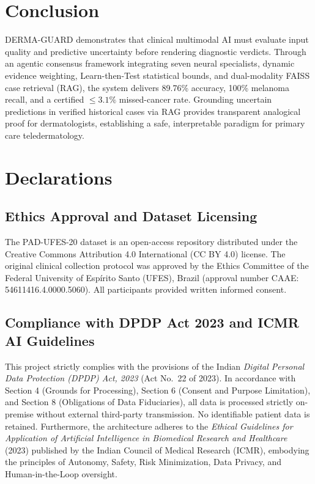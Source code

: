 \documentclass[conference]{IEEEtran}
\begin{document}
\section{Conclusion}
DERMA-GUARD demonstrates that clinical multimodal AI must evaluate input quality and predictive uncertainty before rendering diagnostic verdicts. Through an agentic consensus framework integrating seven neural specialists, dynamic evidence weighting, Learn-then-Test statistical bounds, and dual-modality FAISS case retrieval (RAG), the system delivers 89.76\% accuracy, 100\% melanoma recall, and a certified $\le 3.1\%$ missed-cancer rate. Grounding uncertain predictions in verified historical cases via RAG provides transparent analogical proof for dermatologists, establishing a safe, interpretable paradigm for primary care teledermatology.


\section*{Declarations}

\subsection*{Ethics Approval and Dataset Licensing}
The PAD-UFES-20 dataset is an open-access repository distributed under the Creative Commons Attribution 4.0 International (CC BY 4.0) license. The original clinical collection protocol was approved by the Ethics Committee of the Federal University of Esp\'irito Santo (UFES), Brazil (approval number CAAE: 54611416.4.0000.5060). All participants provided written informed consent.

\subsection*{Compliance with DPDP Act 2023 and ICMR AI Guidelines}
This project strictly complies with the provisions of the Indian \textit{Digital Personal Data Protection (DPDP) Act, 2023} (Act No.\ 22 of 2023). In accordance with Section 4 (Grounds for Processing), Section 6 (Consent and Purpose Limitation), and Section 8 (Obligations of Data Fiduciaries), all data is processed strictly on-premise without external third-party transmission. No identifiable patient data is retained. Furthermore, the architecture adheres to the \textit{Ethical Guidelines for Application of Artificial Intelligence in Biomedical Research and Healthcare} (2023) published by the Indian Council of Medical Research (ICMR), embodying the principles of Autonomy, Safety, Risk Minimization, Data Privacy, and Human-in-the-Loop oversight.
\end{document}
